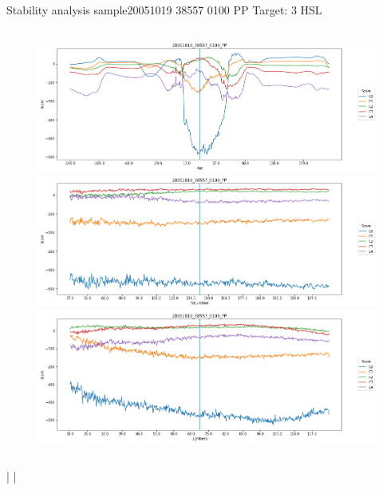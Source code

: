 \documentclass{beamer}
\begin{document}
\begin{frame}{Stability analysis sample}{20051019 38557 0100 PP Target: 3 HSL}
\begin{columns}
\begin{column}{0.45\textwidth}
\begin{figure}[p]
		\includegraphics[width=\textwidth]{chapter_stability/20051019_38557_0100_PP/h/scores.png}			\includegraphics[width=\textwidth]{chapter_stability/20051019_38557_0100_PP/s/scores.png}			\includegraphics[width=\textwidth]{chapter_stability/20051019_38557_0100_PP/l/scores.png}
	\end{figure}
\end{column}
\end{columns}
\href{run:videos_stability/Messidor_20051019_38557_0100_PP_Target_3_Checking_Hue_Sensitivity.mp4}{\color{blue}{Hue}} | \href{run:videos_stability/Messidor_20051019_38557_0100_PP_Target_3_Checking_Saturation_Sensitivity.mp4}{\color{blue}{Saturation}} | \href{run:videos_stability/Messidor_20051019_38557_0100_PP_Target_3_Checking_Luminance_Sensitivity.mp4}{\color{blue}{Lightness}}
\end{frame}
\end{document}
